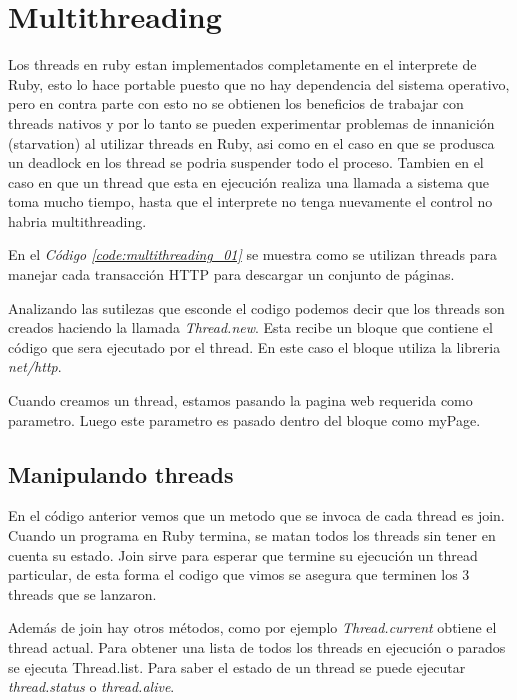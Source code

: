\documentclass{article}
\newcommand{\refcode}[1]{\textit{Código \ref{#1}}}
\begin{document}
\section{Multithreading}

	Los threads en ruby estan implementados completamente en el interprete de Ruby, esto lo hace portable puesto que no hay dependencia del sistema operativo, pero en contra parte con esto no se obtienen los beneficios de trabajar con threads nativos y por lo tanto se pueden experimentar problemas de innanición (starvation) al utilizar threads en Ruby, asi como en el caso en que se produsca un deadlock en los thread se podria suspender todo el proceso. Tambien en el caso en que un thread que esta en ejecución realiza una llamada a sistema que toma mucho tiempo, hasta que el interprete no tenga nuevamente el control no habria multithreading.
	\par
	En el \refcode{code:multithreading_01} se muestra como se utilizan threads para manejar cada transacción HTTP para descargar un conjunto de páginas.

 
\bigskip

	Analizando las sutilezas que esconde el codigo podemos decir que los threads son creados haciendo la llamada \textit{Thread.new}. Esta recibe un bloque que contiene el código que sera ejecutado por el thread. En este caso el bloque utiliza la libreria \textit{net/http}.
	\par
	Cuando creamos un thread, estamos pasando la pagina web requerida como parametro. Luego este parametro es pasado dentro del bloque como myPage.


\subsection{Manipulando threads}

	En el código anterior vemos que un metodo que se invoca de cada thread es join. Cuando un programa en Ruby termina, se matan todos los threads sin tener en cuenta su estado. Join sirve para esperar que termine su ejecución un thread particular, de esta forma el codigo que vimos se asegura que terminen los 3 threads que se lanzaron.
	\par
	Además de join hay otros métodos, como por ejemplo \textit{Thread.current} obtiene el thread actual. Para obtener una lista de todos los threads en ejecución o parados se ejecuta Thread.list. Para saber el estado de un thread se puede ejecutar \textit{thread.status} o \textit{thread.alive}.
\end{document}

